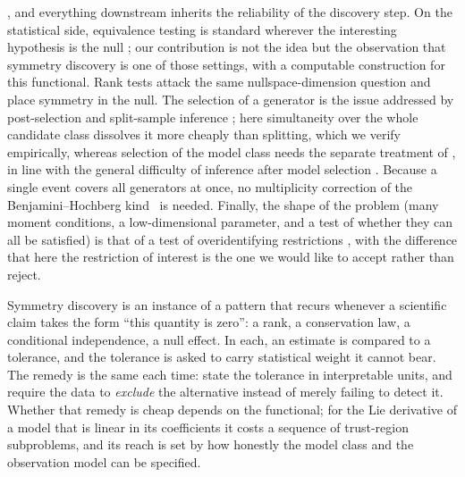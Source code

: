 \citep{yang2024symmetry}, and everything downstream inherits the reliability of
the discovery step. On the statistical side, equivalence testing is standard
wherever the interesting hypothesis is the null
\citep{schuirmann1987comparison,berger1996bioequivalence,wellek2010testing};
our contribution is not the idea but the observation that symmetry discovery is
one of those settings, with a computable construction for this functional.
Rank tests \citep{cragg1997inferring,robin2000tests,kleibergen2006generalized}
attack the same nullspace-dimension question and place symmetry in the null.
The selection of a generator is the issue addressed by post-selection and
split-sample inference \citep{berk2013valid,lee2016exact,meinshausen2009pvalues,
chernozhukov2018double,andrews2024inference}; here simultaneity over the whole
candidate class dissolves it more cheaply than splitting, which we verify
empirically, whereas selection of the model class needs the separate treatment
of , in line with the general difficulty of inference after
model selection \citep{leeb2005model}. Because a single event covers all
generators at once, no multiplicity correction of the Benjamini--Hochberg
kind~\citep{benjamini1995controlling} is needed. Finally, the shape of the
problem (many moment conditions, a low-dimensional parameter, and a test of
whether they can all be satisfied) is that of a test of overidentifying
restrictions \citep{hansen1982large}, with the difference that here the
restriction of interest is the one we would like to accept rather than reject.

Symmetry discovery is an instance of a pattern that recurs whenever a
scientific claim takes the form ``this quantity is zero'': a rank, a
conservation law, a conditional independence, a null effect. In each, an
estimate is compared to a tolerance, and the tolerance is asked to carry
statistical weight it cannot bear. The remedy is the same each time: state the
tolerance in interpretable units, and require the data to \emph{exclude} the
alternative instead of merely failing to detect it. Whether that remedy is
cheap depends on the functional; for the Lie derivative of a model that is
linear in its coefficients it costs a sequence of trust-region subproblems, and
its reach is set by how honestly the model class and the observation model can
be specified.
